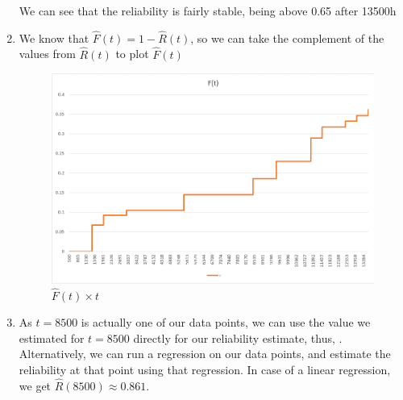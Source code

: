 \documentclass{article}
\begin{document}
\begin{enumerate}[label=(\alph*)]
    We can see that the reliability is fairly stable, being above 0.65 after 13500h
    \item We know that $\hat{F}(t) = 1 - \hat{R}(t)$, so we can take the complement of the values from $\hat{R}(t)$ to plot $\hat{F}(t)$

    \begin{figure}[H]
        \centering
        \includegraphics[width=0.8\linewidth]{q3_ft.png}
        \caption{$\hat{F}(t) \times t$}
        \label{fig:q3_km_ft}
    \end{figure}

    \item As $t=8500$ is actually one of our data points, we can use the value we estimated for $t=8500$ directly for our reliability estimate, thus, . Alternatively, we can run a regression on our data points, and estimate the reliability at that point using that regression. In case of a linear regression, we get $\hat{R}(8500) \approx 0.861$.
\end{enumerate}
\end{document}
